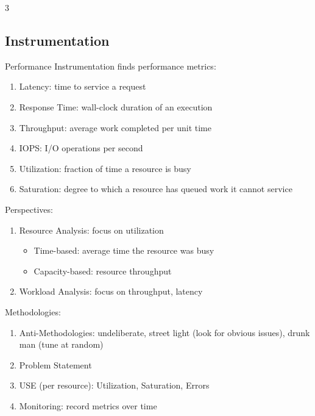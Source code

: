 \documentclass[12pt, a4paper]{article}
\begin{document}
\begin{multicols*}{3}
\subsection{Instrumentation}
Performance Instrumentation finds performance metrics:
\begin{enumerate}[\roman*.]
  \item Latency: time to service a request 
  \item Response Time: wall-clock duration of an execution
  \item Throughput: average work completed per unit time
  \item IOPS: I/O operations per second
  \item Utilization: fraction of time a resource is busy
  \item Saturation: degree to which a resource has queued work it cannot service 
\end{enumerate}

Perspectives:
\begin{enumerate}[\roman*.]
  \item Resource Analysis: focus on utilization
    \begin{itemize}[leftmargin=*]\vspace{3pt}
      \item Time-based: average time the resource was busy 
      \item Capacity-based: resource throughput
    \end{itemize}
  \item Workload Analysis: focus on throughput, latency
\end{enumerate}

Methodologies:
\begin{enumerate}[\roman*.]
  \item Anti-Methodologies: undeliberate, street light (look for obvious issues), drunk man (tune at random)
  \item Problem Statement
  \item USE (per resource): Utilization, Saturation, Errors
  \item Monitoring: record metrics over time
\end{enumerate}


\end{multicols*}
\end{document}

